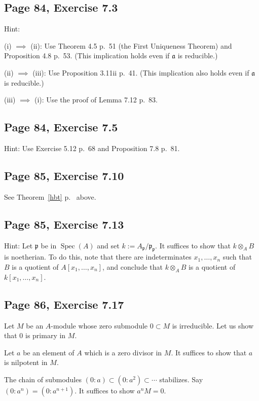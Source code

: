 \documentclass[parskip=half,fontsize=12pt]{scrartcl}%
\newcommand{\oo}{\operatorname}\newcommand{\ooo}{\operatorname*}
\newcommand{\mf}{\mathfrak}
\newcommand{\aaa}{\mf a}
\newcommand{\ppp}{\mf p}
\begin{document}
\subsection{Page 84, Exercise 7.3}%

Hint: 

(i) $\implies$ (ii): Use Theorem 4.5 p.~51 (the First Uniqueness Theorem) and Proposition 4.8 p.~53. (This implication holds even if $\aaa$ is reducible.)

(ii) $\implies$ (iii): Use Proposition 3.11ii p.~41. (This implication also holds even if $\aaa$ is reducible.)

(iii) $\implies$ (i): Use the proof of Lemma 7.12 p.~83.

\subsection{Page 84, Exercise 7.5}%

Hint: Use Exercise 5.12 p.~68 and Proposition 7.8 p.~81.

\subsection{Page 85, Exercise 7.10}%

See Theorem~\ref{hbt} p.~\pageref{hbt} above.

\subsection{Page 85, Exercise 7.13}%

Hint: Let $\ppp$ be in $\oo{Spec}(A)$ and set $k:=A_\ppp/\ppp_\ppp$. It suffices to show that $k\otimes_AB$ is noetherian. To do this, note that there are indeterminates $x_1,\dots,x_n$ such that $B$ is a quotient of $A[x_1,\dots,x_n]$, and conclude that $k\otimes_AB$ is a quotient of $k[x_1,\dots,x_n]$. 

\subsection{Page 86, Exercise 7.17}%

Let $M$ be an $A$-module whose zero submodule $0\subset M$ is irreducible. Let us show that $0$ is primary in $M$. 

Let $a$ be an element of $A$ which is a zero divisor in $M$. It suffices to show that $a$ is nilpotent in $M$. 

The chain of submodules $(0:a)\subset(0:a^2)\subset\cdots$ stabilizes. Say $(0:a^n)=(0:a^{n+1})$. It suffices to show $a^nM=0$. 
\end{document}
